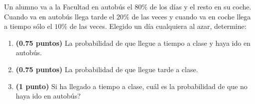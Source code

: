 
Un alumno va a la Facultad en autobús el $80\%$ de los días y el resto en su coche. Cuando va en autobús llega tarde el $20\%$ de las veces y cuando va en coche llega a tiempo sólo el $10\%$ de las veces. Elegido un día cualquiera al azar, determine:
\begin{enumerate}[label=\alph*)]
\item \textbf{(0.75 puntos)} La probabilidad de que llegue a tiempo a clase y haya ido en autobús.
\item \textbf{(0.75 puntos)} La probabilidad de que llegue tarde a clase.
\item \textbf{(1 punto)} Si ha llegado a tiempo a clase, \textquestiondown{}cuál es la probabilidad de que no haya ido en autobús?
\end{enumerate}
